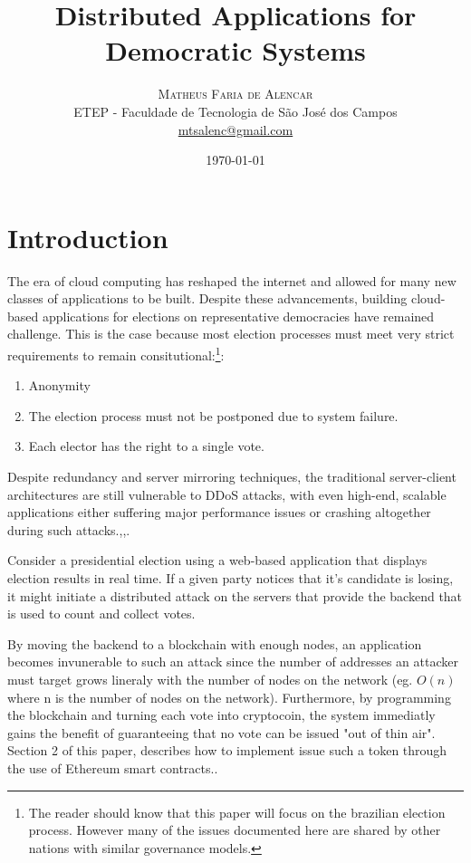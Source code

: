 \documentclass[twoside]{article}
\title{Distributed Applications for Democratic Systems} %
\author{%
\textsc{Matheus Faria de Alencar} \\[1ex] %
\normalsize ETEP - Faculdade de Tecnologia de S\~ao Jos\'e dos Campos \\ %
\normalsize \href{mailto:mtsalenc@gmail.com}{mtsalenc@gmail.com} %
}
\date{\today} %
\begin{document}
\maketitle


\section{Introduction}

The era of cloud computing has reshaped the internet and allowed for many new classes of applications to be built. Despite these advancements, building cloud-based applications for elections on representative democracies have remained challenge. This is the case because most election processes must meet very strict requirements to remain consitutional:\footnote{The reader should know that this paper will focus on the brazilian election process. However many of the issues documented here are shared by other nations with similar governance models.}:
\begin{enumerate}
\item Anonymity
\item The election process must not be postponed due to system failure.
\item Each elector has the right to a single vote.
\end{enumerate}

Despite redundancy and server mirroring techniques, the traditional server-client architectures are still vulnerable to DDoS attacks, with even high-end, scalable applications either suffering major performance issues or crashing altogether during such attacks.\cite{1},\cite{2},\cite{3}.

Consider a presidential election using a web-based application that displays election results in real time. If a given party notices that it's candidate is losing, it might initiate a distributed attack on the servers that provide the backend that is used to count and collect votes. 

By moving the backend to a blockchain with enough nodes, an application becomes invunerable to such an attack since the number of addresses an attacker must target grows lineraly with the number of nodes on the network (eg. $O(n)$ where n is the number of nodes on the network). Furthermore, by  programming the blockchain and turning each vote into cryptocoin, the system immediatly gains the benefit of guaranteeing that no vote can be issued "out of thin air". Section 2 of this paper, describes how to implement issue such a token through the use of Ethereum smart contracts.\cite{4}.
\end{document}
